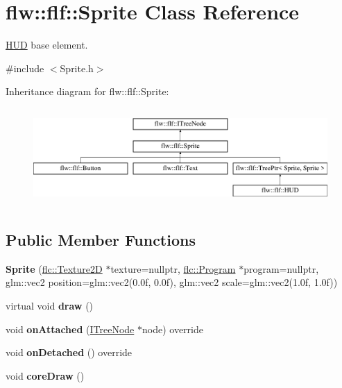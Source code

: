 \hypertarget{classflw_1_1flf_1_1Sprite}{}\section{flw\+:\+:flf\+:\+:Sprite Class Reference}
\label{classflw_1_1flf_1_1Sprite}


\hyperlink{classflw_1_1flf_1_1HUD}{H\+UD} base element.  




{\ttfamily \#include $<$Sprite.\+h$>$}

Inheritance diagram for flw\+:\+:flf\+:\+:Sprite\+:\begin{figure}[H]
\begin{center}
\leavevmode
\includegraphics[height=3.733333cm]{classflw_1_1flf_1_1Sprite}
\end{center}
\end{figure}
\subsection*{Public Member Functions}
\begin{DoxyCompactItemize}
\item 
\mbox{\label{classflw_1_1flf_1_1Sprite_a5411f03f1ee3afedbb59277434547ba2}} 
{\bfseries Sprite} (\hyperlink{classflw_1_1flc_1_1Texture2D}{flc\+::\+Texture2D} $\ast$texture=nullptr, \hyperlink{classflw_1_1flc_1_1Program}{flc\+::\+Program} $\ast$program=nullptr, glm\+::vec2 position=glm\+::vec2(0.\+0f, 0.\+0f), glm\+::vec2 scale=glm\+::vec2(1.\+0f, 1.\+0f))
\item 
\mbox{\label{classflw_1_1flf_1_1Sprite_a81c847b81d3beddba37c5580778aa21b}} 
virtual void {\bfseries draw} ()
\item 
\mbox{\label{classflw_1_1flf_1_1Sprite_a655621f928d85139626ada590b17a806}} 
void {\bfseries on\+Attached} (\hyperlink{classflw_1_1flf_1_1ITreeNode}{I\+Tree\+Node} $\ast$node) override
\item 
\mbox{\label{classflw_1_1flf_1_1Sprite_a8486ad3dbd20af1aec597219cb397cc9}} 
void {\bfseries on\+Detached} () override
\item 
\mbox{\label{classflw_1_1flf_1_1Sprite_a6432b2508450ada808cc8858d2e9d876}} 
void {\bfseries core\+Draw} ()
\end{DoxyCompactItemize}
